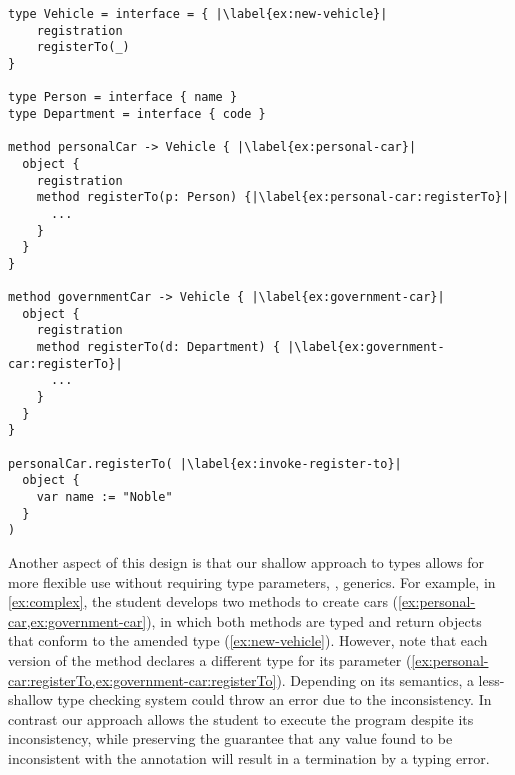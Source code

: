 \begin{lstlisting}[caption={A program in development with a well-typed execution.},escapechar=|,label={ex:complex},float,floatplacement=htb]
type Vehicle = interface = { |\label{ex:new-vehicle}|
    registration
    registerTo(_)
}

type Person = interface { name }
type Department = interface { code }

method personalCar -> Vehicle { |\label{ex:personal-car}|
  object {
    registration
    method registerTo(p: Person) {|\label{ex:personal-car:registerTo}|
      ...
    } 
  }
}

method governmentCar -> Vehicle { |\label{ex:government-car}|
  object {
    registration
    method registerTo(d: Department) { |\label{ex:government-car:registerTo}|
      ...
    }
  }
}

personalCar.registerTo( |\label{ex:invoke-register-to}|
  object {
    var name := "Noble"
  }
)
\end{lstlisting}

Another aspect of this design is
that our shallow approach to types
allows for more flexible use 
without requiring type parameters, \ie, generics.
For example, in \cref{ex:complex}, the student
develops two methods to create cars 
(\cref{ex:personal-car,ex:government-car}),
in which both methods are typed and return objects that conform to
the amended  type (\cref{ex:new-vehicle}).
However, note that each version of the  method
declares a different type for its parameter
(\cref{ex:personal-car:registerTo,ex:government-car:registerTo}).
Depending on its semantics,
a less-shallow type checking system could throw an error
due to the inconsistency.
In contrast
our approach allows the student to execute the program 
despite its inconsistency, 
while preserving the guarantee that any value found to be
inconsistent with the annotation will result in
a termination by a typing error.




